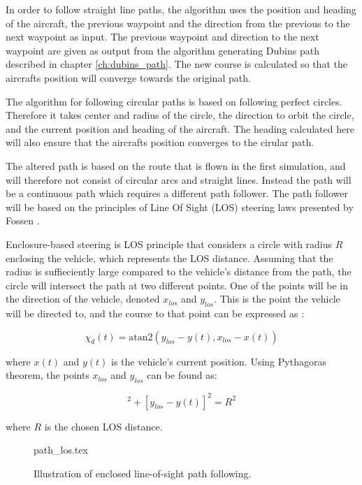 In order to follow straight line paths, the algorithm uses the position and heading of the aircraft, the previous waypoint and the direction from the previous to the next waypoint as input. The previous waypoint and direction to the next waypoint are given as output from the algorithm generating Dubins path described in chapter \ref{ch:dubins_path}. The new course is calculated so that the aircrafts position will converge towards the original path.

The algorithm for following circular paths is based on following perfect circles. Therefore it takes center and radius of the circle, the direction to orbit the circle, and the current position and heading of the aircraft. The heading calculated here will also ensure that the aircrafts position converges to the cirular path.

The altered path is based on the route that is flown in the first simulation, and will therefore not consist of circular arcs and straight lines. Instead the path will be a continuous path which requires a different path follower. The path follower will be based on the principles of Line Of Sight (LOS) steering laws presented by Fossen \cite{fartoyFOSSEN}.

Enclosure-based steering is LOS principle that considers a circle with radius $R$ enclosing the vehicle, which represents the LOS distance. Assuming that the radius is suffieciently large compared to the vehicle's distance from the path, the circle will intersect the path at two different points. One of the points will be in the direction of the vehicle, denoted $x_{los}$ and $y_{los}$. This is the point the vehicle will be directed to, and the course to that point can be expressed as \cite{fartoyFOSSEN}:

\begin{equation}
	\chi_d(t) = \text{atan2}(y_{los} - y(t), x_{los} - x(t))
\end{equation}

where $x(t)$ and $y(t)$ is the vehicle's current position. Using Pythagoras theorem, the points $x_{los}$ and $y_{los}$ can be found as:

\begin{equation}
	[x_{los} - x(t)]^2 + [y_{los} - y(t)]^2 = R^2
\end{equation}

where $R$ is the chosen LOS distance.

\begin{figure}
	{path_los.tex}
	\caption{Illustration of enclosed line-of-sight path following.}
	\label{fig:path_los}
\end{figure}